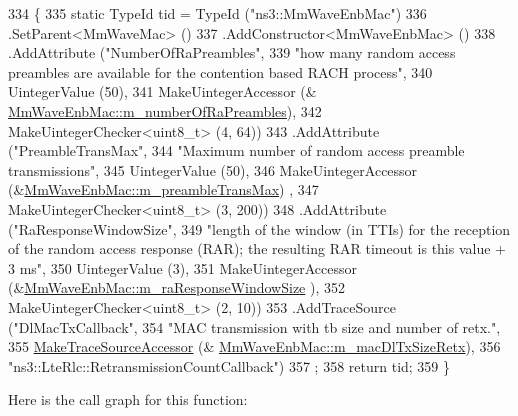 \begin{DoxyCode}
334 \{
335         \textcolor{keyword}{static} TypeId tid = TypeId (\textcolor{stringliteral}{"ns3::MmWaveEnbMac"})
336                         .SetParent<MmWaveMac> ()
337                         .AddConstructor<MmWaveEnbMac> ()
338                         .AddAttribute (\textcolor{stringliteral}{"NumberOfRaPreambles"},
339                            \textcolor{stringliteral}{"how many random access preambles are available for the contention based RACH
       process"},
340                            UintegerValue (50),
341                            MakeUintegerAccessor (&
      \hyperlink{classns3_1_1MmWaveEnbMac_a502eb4952b5d1b4ec900b4a1a87c2b09}{MmWaveEnbMac::m\_numberOfRaPreambles}),
342                            MakeUintegerChecker<uint8\_t> (4, 64))
343                     .AddAttribute (\textcolor{stringliteral}{"PreambleTransMax"},
344                    \textcolor{stringliteral}{"Maximum number of random access preamble transmissions"},
345                    UintegerValue (50),
346                    MakeUintegerAccessor (&\hyperlink{classns3_1_1MmWaveEnbMac_aef250f882f47179d01462f761f88be20}{MmWaveEnbMac::m\_preambleTransMax})
      ,
347                    MakeUintegerChecker<uint8\_t> (3, 200))
348                     .AddAttribute (\textcolor{stringliteral}{"RaResponseWindowSize"},
349                    \textcolor{stringliteral}{"length of the window (in TTIs) for the reception of the random access response (RAR);
       the resulting RAR timeout is this value + 3 ms"},
350                    UintegerValue (3),
351                    MakeUintegerAccessor (&\hyperlink{classns3_1_1MmWaveEnbMac_a8db7bd062ae554672abb903e9e729e75}{MmWaveEnbMac::m\_raResponseWindowSize}
      ),
352                    MakeUintegerChecker<uint8\_t> (2, 10))
353                 .AddTraceSource (\textcolor{stringliteral}{"DlMacTxCallback"},
354                                         \textcolor{stringliteral}{"MAC transmission with tb size and number of retx."},
355                                         \hyperlink{group__tracing_gab21a770b9855af4e8f69f7531ea4a6b0}{MakeTraceSourceAccessor} (&
      \hyperlink{classns3_1_1MmWaveEnbMac_a032e682229bff1f0d54f28c700a7f67d}{MmWaveEnbMac::m\_macDlTxSizeRetx}),
356                                         \textcolor{stringliteral}{"ns3::LteRlc::RetransmissionCountCallback"})
357         ;
358         \textcolor{keywordflow}{return} tid;
359 \}
\end{DoxyCode}


Here is the call graph for this function\+:


